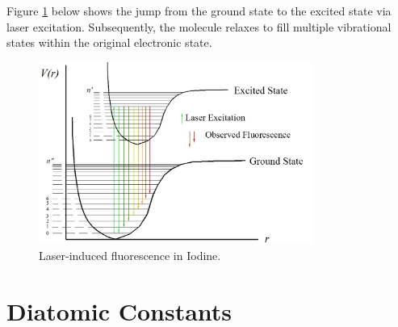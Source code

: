 \documentclass[11pt, twoside, fleqn]{report}
\DeclareRobustCommand\_{\ifmmode\expandafter\subtxt\else\textunderscore\fi}
\begin{document}
Figure \ref{f:laser-induced_fluorescence_in_iodine} below shows the jump from the ground state to the excited state via laser excitation. Subsequently, the molecule relaxes to fill multiple vibrational states within the original electronic state.

\begin{figure}[H]
    \centering
    \includegraphics[width=0.8\textwidth]{img/lif_bands.jpg}
    \caption{Laser-induced fluorescence in Iodine.}
    \label{f:laser-induced_fluorescence_in_iodine}
\end{figure}

\appendix
\chapter{Diatomic Constants}
\label{a:diatomic_constants}
\end{document}
